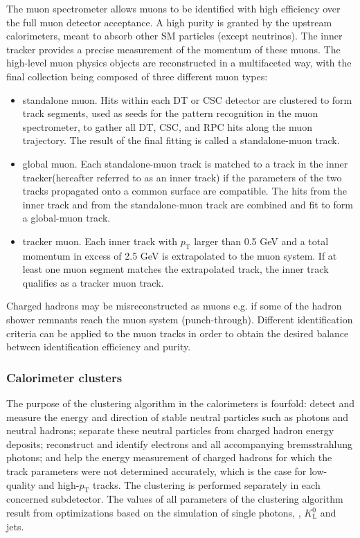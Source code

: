  The  muon  spectrometer allows muons to be identified with high efficiency over the full muon detector acceptance.  A high purity is granted by the upstream calorimeters, meant to absorb other SM particles (except neutrinos).  The inner tracker provides a precise measurement of the momentum of these muons.  The high-level muon physics objects are reconstructed in a multifaceted way, with the final collection being composed of three different muon types:
 
 \begin{itemize}
     \item standalone muon.  Hits within each DT or CSC detector are clustered to form track segments,  used as seeds for the pattern recognition in the muon spectrometer,  to gather all DT, CSC, and RPC hits along the muon trajectory.  The result of the final fitting is called a standalone-muon track.
     \item global muon.  Each standalone-muon track is matched to a track in the inner tracker(hereafter referred to as an inner track) if the parameters of the two tracks propagated onto a common surface are compatible.  The hits from the inner track and from the standalone-muon track are combined and fit to form a global-muon track.
     \item tracker muon. Each inner track with $p_{\mathrm{T}}$ larger than 0.5 GeV and a total momentum in excess of 2.5 GeV is extrapolated to the muon system. If at least one muon segment matches the extrapolated track, the inner track qualifies as a tracker muon track.
 \end{itemize}
 
 Charged hadrons may be misreconstructed as muons e.g. if some of the hadron shower remnants reach the muon system (punch-through).  Different identification criteria can be applied to the muon tracks in order to obtain the desired balance between identification efficiency and purity. 

\subsubsection{Calorimeter clusters}

The purpose of the clustering algorithm in the calorimeters is fourfold: detect and measure the energy and direction of stable neutral particles such as photons and neutral hadrons; separate these neutral particles from charged hadron energy deposits; reconstruct and identify electrons and all accompanying bremsstrahlung photons; and help the energy measurement of charged hadrons for which the track parameters were not determined accurately, which is the case for low-quality and high-$p_{\mathrm{T}}$ tracks. The clustering is performed separately in each concerned subdetector. The values of all parameters of the clustering algorithm result from optimizations based on the simulation of single photons, \pizero, $K^0_{\mathrm{L}}$ and jets.

